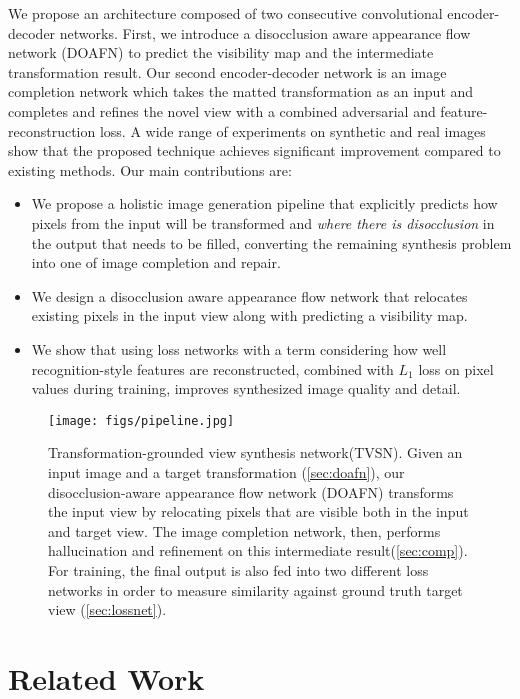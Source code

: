 \documentclass[10pt,twocolumn,letterpaper]{article}
\begin{document}
We propose an architecture composed of two consecutive convolutional encoder-decoder networks. First, we introduce a disocclusion aware appearance flow network (DOAFN) to predict the visibility map and the intermediate transformation result. Our second encoder-decoder network is an image completion network which takes the matted transformation as an input and completes and refines the novel view with a combined adversarial and feature-reconstruction loss. A wide range of experiments on synthetic and real images show that the proposed technique achieves significant improvement compared to existing methods.
Our main contributions are:
\begin{itemize}
\item We propose a holistic image generation pipeline that explicitly predicts how pixels from the input will be transformed and {\em where there is disocclusion} in the output that needs to be filled, converting the remaining synthesis problem into one of image completion and repair.
\item We design a disocclusion aware appearance flow network that relocates existing pixels in the input view along with predicting a visibility map.  
\item We show that using loss networks with a term considering how well recognition-style features are reconstructed, combined with $L_1$ loss on pixel values during training, improves synthesized image quality and detail.
\end{itemize}

\begin{figure*}[t]
\begin{center}
\texttt{[image: figs/pipeline.jpg]}
\end{center}
\caption{Transformation-grounded view synthesis network(TVSN). Given an input image and a target transformation (\ref{sec:doafn}), our disocclusion-aware appearance flow network (DOAFN) transforms the input view by relocating pixels that are visible both in the input and target view. The image completion network, then, performs hallucination and refinement on this intermediate result(\ref{sec:comp}). For training, the final output is also fed into two different loss networks in order to measure similarity against ground truth target view (\ref{sec:lossnet}). }
\label{fig:pipeline}
\end{figure*}


\vspace{-1mm}
\vspace{-1mm}
\section{Related Work}
\end{document}
